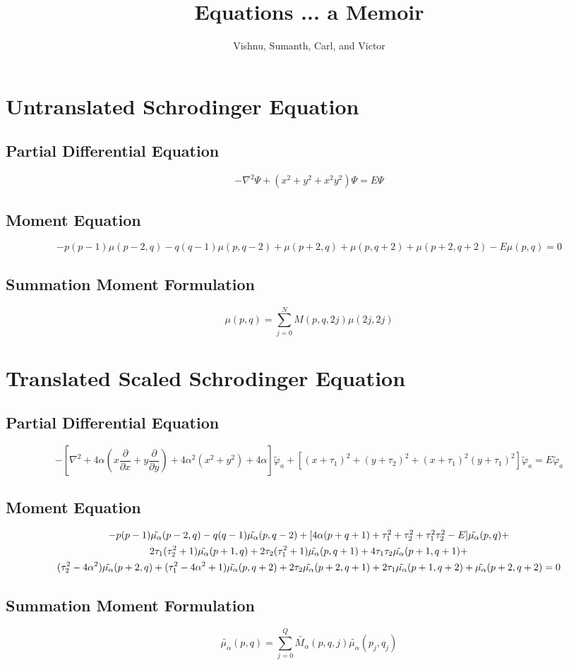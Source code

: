 \documentclass[letterpaper]{article}
\title{Equations ... a Memoir}
\author{Vishnu, Sumanth, Carl, and Victor}
\begin{document}
	\maketitle
	\newpage
	\tableofcontents
	\newpage
	\section{Untranslated Schrodinger Equation}
	\subsection{Partial Differential Equation}
	\begin{equation*}
		-{\nabla}^2\Psi+(x^2+y^2+x^2y^2)\Psi=E\Psi
	\end{equation*}
	\subsection{Moment Equation}
	\begin{equation*}
		-p(p-1)\mu(p-2,q)-q(q-1)\mu(p,q-2)+\mu(p+2,q)+\mu(p,q+2)+\mu(p+2,q+2)-E\mu(p,q)=0
	\end{equation*}
	\subsection{Summation Moment Formulation}
	\begin{equation*}
		\mu(p,q)=\sum_{j=0}^N M(p,q,2j)\mu(2j,2j)
	\end{equation*}
	\section{Translated Scaled Schrodinger Equation}
	\subsection{Partial Differential Equation}
	\begin{equation*}
		-[{\nabla}^2+4\alpha(x\frac{\partial}{\partial x}+y\frac{\partial}{\partial y})+4{\alpha}^2(x^2+y^2)+4\alpha]\tilde{\varphi}_a +[(x+{\tau}_1)^2+(y+{\tau}_2)^2+(x+{\tau}_1)^2(y+{\tau}_1)^2]\tilde{\varphi}_a=E\tilde{\varphi}_a
	\end{equation*}
	\subsection{Moment Equation}
	\begin{multline*}
		$$-p(p-1)\tilde{\mu_\alpha}(p-2,q)-q(q-1)\tilde{\mu_\alpha}(p,q-2)+[4\alpha(p+q+1)+\tau_1^2+\tau_2^2+\tau_1^2\tau_2^2-E]\tilde{\mu_\alpha}(p,q)+\\2\tau_1(\tau_2^2+1)\tilde{\mu_\alpha}(p+1,q)+2\tau_2(\tau_1^2+1)\tilde{\mu_\alpha}(p,q+1)+4\tau_1\tau_2\tilde{\mu_\alpha}(p+1,q+1)+\\(\tau_2^2-4\alpha^2)\tilde{\mu_\alpha}(p+2,q)+(\tau_1^2-4\alpha^2+1)\tilde{\mu_\alpha}(p,q+2)+2\tau_2\tilde{\mu_\alpha}(p+2,q+1)+2\tau_1\tilde{\mu_\alpha}(p+1,q+2)+\tilde{\mu_\alpha}(p+2,q+2)=0$$
	\end{multline*}
	\subsection{Summation Moment Formulation}
	\begin{equation*}
		\tilde{\mu_\alpha}(p,q)=\sum_{j=0}^Q\tilde{M_\alpha}(p,q,j)\tilde{\mu_\alpha}(p_j,q_j)
	\end{equation*}
\end{document}
